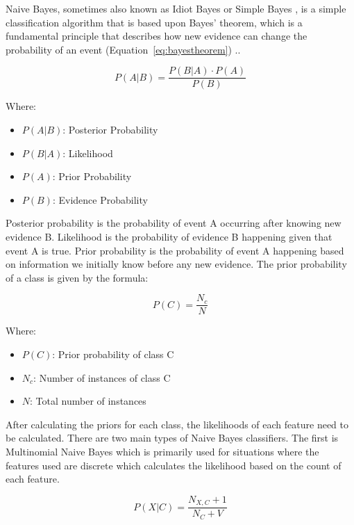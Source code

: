 Naive Bayes, sometimes also known as Idiot Bayes or Simple Bayes \cite{PDFIdiotsBayes2024}, is a simple classification algorithm that is based upon Bayes' theorem, which is a fundamental principle that describes how new evidence can change the probability of an event (Equation~\ref{eq:bayestheorem}) .\cite{lowdNaiveBayesModels2005}. 

\begin{equation}
    \label{eq:bayestheorem}
    P(A|B) = \frac{P(B|A) \cdot P(A)}{P(B)}
\end{equation}

Where:
\begin{itemize}
    \item $P(A|B)$: Posterior Probability
    \item $P(B|A)$: Likelihood
    \item $P(A)$: Prior Probability
    \item $P(B)$: Evidence Probability 
\end{itemize} 

Posterior probability is the probability of event A occurring after knowing new evidence B. Likelihood is the probability of evidence B happening given that event A is true. Prior probability is the probability of event A happening based on information we initially know before any new evidence. The prior probability of a class is given by the formula:

\begin{equation}
    \label{eq:prior}
    P(C) = \frac{N_c}{N}
\end{equation}

Where:
\begin{itemize}
    \item $P(C)$: Prior probability of class C
    \item $N_c$: Number of instances of class C
    \item $N$: Total number of instances
\end{itemize}

After calculating the priors for each class, the likelihoods of each feature need to be calculated. There are two main types of Naive Bayes classifiers. The first is Multinomial Naive Bayes which is primarily used for situations where the features used are discrete which calculates the likelihood based on the count of each feature.

\begin{equation}
    \label{eq:multinomial}
    P(X | C) = \frac{N_{X,C} + 1}{N_C + V}
\end{equation}

